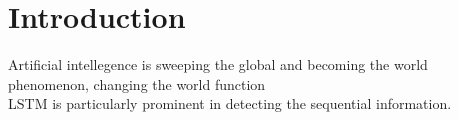 \section{Introduction}
Artificial intellegence is sweeping the global and becoming the world phenomenon, changing the world function 
\\
LSTM is particularly prominent in detecting the sequential information. 
